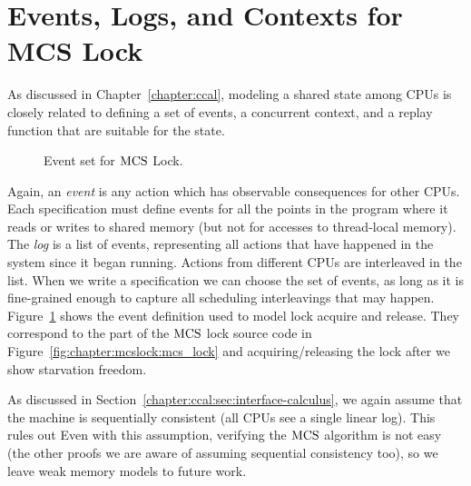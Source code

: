 \section{Events, Logs, and  Contexts for MCS Lock}
\label{chapter:mcslock:sec:eventlogandoracle}

As discussed in Chapter~\ref{chapter:ccal}, 
modeling a shared state among CPUs is 
closely related to defining a set of events, a concurrent context, and a replay function that are suitable for
the state.
\begin{figure}
\begin{minipage}{\linewidth}

\end{minipage}
\caption{Event set for $\mathrm{MCS}$ Lock.}
\label{fig:chapter:mcslock:lock_event_type}
\end{figure}
Again, an \emph{event} is any action which has observable consequences for
other CPUs. Each specification must define events for all the points
in the program where it reads or writes to shared memory (but not for
accesses to thread-local memory). The \emph{log} is a list of
events, representing all actions that have happened in the system
since it began running. Actions from different CPUs are interleaved in
the list.
When we write a specification we can choose the set of events, as long
as it is fine-grained enough to capture all scheduling interleavings
that may happen.
Figure~\ref{fig:chapter:mcslock:lock_event_type} shows the event definition used to
model lock acquire and release. They correspond to the part of the $\mathrm{MCS}$ lock source code in Figure~\ref{fig:chapter:mcslock:mcs_lock}
and acquiring/releasing the lock after we show starvation freedom. 


As discussed in Section~\ref{chapter:ccal:sec:interface-calculus},  we again assume that the
machine is sequentially consistent (all CPUs see a single linear log). 
This rules out 
Even with this assumption,
verifying the $\mathrm{MCS}$ algorithm is not easy (the other proofs we are aware
of assuming sequential consistency too), so we leave weak memory models
to future work.


